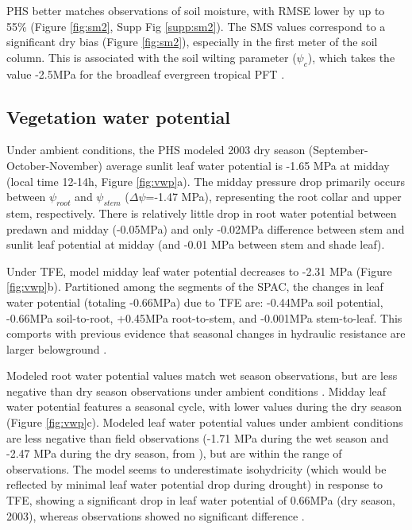 \documentclass[draft,linenumbers]{agujournal}
\begin{document}
    PHS better matches observations of soil moisture, with RMSE lower by up to 55\% (Figure \ref{fig:sm2}, Supp Fig \ref{supp:sm2}).
    The SMS values correspond to a significant dry bias (Figure \ref{fig:sm2}), especially in the first meter of the soil column.
    This is associated with the soil wilting parameter ($\psi_c$), which takes the value -2.5MPa for the broadleaf evergreen tropical PFT \citep{oleson2013}.


\subsection{Vegetation water potential}

    Under ambient conditions, the PHS modeled 2003 dry season (September-October-November) average sunlit leaf water potential is -1.65 MPa at midday (local time 12-14h, Figure \ref{fig:vwp}a). 
    The midday pressure drop primarily occurs between $\psi_{root}$ and $\psi_{stem}$ ($\Delta\psi$=-1.47 MPa), representing the root collar and upper stem, respectively. There is relatively little drop in root water potential between predawn and midday (-0.05MPa) and only -0.02MPa difference between stem and sunlit leaf potential at midday (and -0.01 MPa between stem and shade leaf).
    
    Under TFE, model midday leaf water potential decreases to -2.31 MPa (Figure \ref{fig:vwp}b). 
    Partitioned among the segments of the SPAC, the changes in leaf water potential (totaling -0.66MPa) due to TFE are:
    -0.44MPa soil potential,
    -0.66MPa soil-to-root,
    +0.45MPa root-to-stem, and 
    -0.001MPa stem-to-leaf.
    This comports with previous evidence that seasonal changes in hydraulic resistance are larger belowground \citep{fisher2006}.
    
    Modeled root water potential values match wet season observations, but are less negative than dry season observations under ambient conditions \citep{fisher2006}.
    Midday leaf water potential features a seasonal cycle, with lower values during the dry season (Figure \ref{fig:vwp}c).
    Modeled leaf water potential values under ambient conditions are less negative than field observations (-1.71 MPa during the wet season and -2.47 MPa during the dry season, from \cite{fisher2006}), but are within the range of observations.
    The model seems to underestimate isohydricity (which would be reflected by minimal leaf water potential drop during drought) in response to TFE, showing a significant drop in leaf water potential of 0.66MPa (dry season, 2003), whereas observations showed no significant difference \citep{fisher2006}. 
\end{document}
